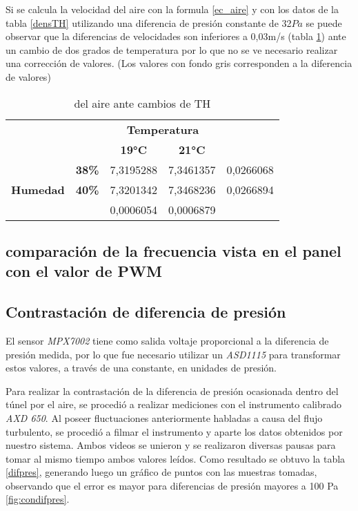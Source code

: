 Si se calcula la velocidad del aire con la formula \ref{ec_aire} y con los datos de la tabla \ref{densTH} utilizando una diferencia de presión constante de 32$Pa$ se puede observar que la diferencias de velocidades son inferiores a 0,03m/s (tabla \ref{velTH}) ante un cambio de dos grados de temperatura por lo que no se ve necesario realizar una corrección de valores.
(Los valores con fondo gris corresponden a la diferencia de valores)
\begin{table}[h!]
	\centering
	\begin{tabular}{lllll}
		&  & \multicolumn{2}{c}{\textbf{Temperatura}} &  \\
		&  & \multicolumn{1}{c}{\textbf{19°C}} & \multicolumn{1}{c}{\textbf{21°C}} & \multicolumn{1}{c}{\textbf{}} \\
		\multicolumn{1}{c}{} & \multicolumn{1}{r}{\textbf{38\%}} & 7,3195288 & 7,3461357 & \cellcolor[HTML]{F2F2F2}0,0266068 \\
		\multicolumn{1}{c}{\multirow{-2}{*}{\textbf{Humedad}}} & \multicolumn{1}{r}{\textbf{40\%}} & 7,3201342 & 7,3468236 & \cellcolor[HTML]{F2F2F2}0,0266894 \\
		& \multicolumn{1}{c}{\textbf{}} & \cellcolor[HTML]{F2F2F2}0,0006054 & \cellcolor[HTML]{F2F2F2}0,0006879 & 
	\end{tabular}
\caption{del aire ante cambios de TH}
\label{velTH}
\end{table}

\subsection{comparación de la frecuencia vista en el panel con el valor de PWM}
\subsection{Contrastación de diferencia de presión}

El sensor \textit{MPX7002} tiene como salida voltaje proporcional a la diferencia de presión medida, por lo que fue necesario utilizar un \textit{ASD1115} para transformar estos valores, a través de una constante, en unidades de presión.

Para realizar la contrastación de la diferencia de presión ocasionada dentro del túnel por el aire, se procedió a realizar mediciones con el instrumento calibrado \textit{AXD 650}. Al poseer fluctuaciones anteriormente habladas a causa del flujo turbulento, se procedió a filmar el instrumento y aparte los datos obtenidos por nuestro sistema. Ambos videos se unieron y se realizaron diversas pausas para tomar al mismo tiempo ambos valores leídos. Como resultado se obtuvo la tabla \ref{difpres}, generando luego un gráfico de puntos con las muestras tomadas, observando que el error es mayor para diferencias de presión mayores a 100 Pa \ref{fig:condifpres}.

